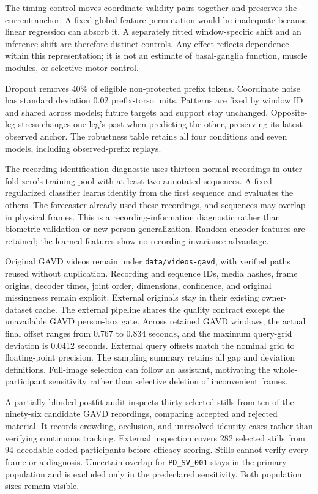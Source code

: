 \documentclass[letterpaper]{article}
\begin{document}
The timing control moves coordinate-validity pairs together and preserves the current anchor. A fixed global feature permutation would be inadequate because linear regression can absorb it. A separately fitted window-specific shift and an inference shift are therefore distinct controls. Any effect reflects dependence within this representation; it is not an estimate of basal-ganglia function, muscle modules, or selective motor control.

Dropout removes 40\% of eligible non-protected prefix tokens. Coordinate noise has standard deviation 0.02 prefix-torso units. Patterns are fixed by window ID and shared across models; future targets and support stay unchanged. Opposite-leg stress changes one leg's past when predicting the other, preserving its latest observed anchor. The robustness table retains all four conditions and seven models, including observed-prefix replays.

The recording-identification diagnostic uses thirteen normal recordings in outer fold zero's training pool with at least two annotated sequences. A fixed regularized classifier learns identity from the first sequence and evaluates the others. The forecaster already used these recordings, and sequences may overlap in physical frames. This is a recording-information diagnostic rather than biometric validation or new-person generalization. Random encoder features are retained; the learned features show no recording-invariance advantage.

Original GAVD videos remain under \texttt{data/videos-gavd}, with verified paths reused without duplication. Recording and sequence IDs, media hashes, frame origins, decoder times, joint order, dimensions, confidence, and original missingness remain explicit. External originals stay in their existing owner-dataset cache. The external pipeline shares the quality contract except the unavailable GAVD person-box gate. Across retained GAVD windows, the actual final offset ranges from 0.767 to 0.834 seconds, and the maximum query-grid deviation is 0.0412 seconds. External query offsets match the nominal grid to floating-point precision. The sampling summary retains all gap and deviation definitions. Full-image selection can follow an assistant, motivating the whole-participant sensitivity rather than selective deletion of inconvenient frames.

A partially blinded postfit audit inspects thirty selected stills from ten of the ninety-six candidate GAVD recordings, comparing accepted and rejected material. It records crowding, occlusion, and unresolved identity cases rather than verifying continuous tracking. External inspection covers 282 selected stills from 94 decodable coded participants before efficacy scoring. Stills cannot verify every frame or a diagnosis. Uncertain overlap for \texttt{PD\_SV\_001} stays in the primary population and is excluded only in the predeclared sensitivity. Both population sizes remain visible.
\end{document}
